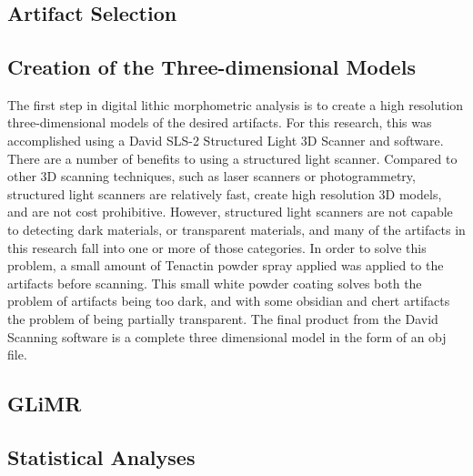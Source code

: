 \chapter{}

\section{Artifact Selection}
	

\section{Creation of the Three-dimensional Models}
	The first step in digital lithic morphometric analysis is to create a high resolution three-dimensional models of the desired artifacts. For this research, this was accomplished using a David SLS-2 Structured Light 3D Scanner and software. There are a number of benefits to using a structured light scanner. Compared to other 3D scanning techniques, such as laser scanners or photogrammetry, structured light scanners are relatively fast, create high resolution 3D models, and are not cost prohibitive.
	However, structured light scanners are not capable to detecting dark materials, or transparent materials, and many of the artifacts in this research fall into one or more of those categories. In order to solve this problem, a small amount of Tenactin powder spray applied was applied to the artifacts before scanning. This small white powder coating solves both the problem of artifacts being too dark, and with some obsidian and chert artifacts the problem of being partially transparent.
	The final product from the David Scanning software is a complete three dimensional model in the form of an obj file.

\section{GLiMR}


\section{Statistical Analyses}
